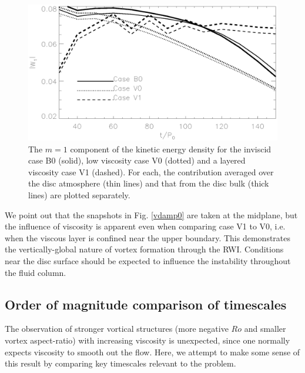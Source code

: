 \begin{figure}
  \centering
  \includegraphics[width=\linewidth]{figures/pdisk_kerz_cases_bump}
  \caption{The $m=1$ component of the kinetic energy density for
    the inviscid case B0 (solid), low viscosity case V0 (dotted) and a
    layered viscosity case V1 (dashed). For each, the contribution 
    averaged over the disc atmosphere (thin lines) and that from the
    disc bulk (thick lines) are plotted separately. 
    \label{bump_energy}}
\end{figure}


We point out that the snapshots in
Fig. \ref{vdamp0} are taken at the midplane, but  
the influence of viscosity is apparent even when comparing case V1 to
V0, i.e. when the viscous layer is confined near the upper
boundary. This demonstrates the vertically-global nature of vortex
formation through the RWI. Conditions near the disc
surface should be expected to influence the instability throughout the
fluid column. 




\subsection{Order of magnitude comparison of timescales}
The observation of stronger vortical structures (more negative $Ro$
and smaller vortex aspect-ratio) with increasing
viscosity is unexpected, since one normally expects viscosity to
smooth out the flow. Here, we  attempt to make some sense of this
result by comparing key timescales relevant to the problem. 

